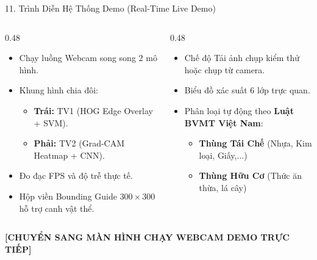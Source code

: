 \documentclass[aspectratio=169, 10pt]{beamer}
\begin{document}
\begin{frame}{11. Trình Diễn Hệ Thống Demo (Real-Time Live Demo)}
\begin{columns}[T]
  \begin{column}{0.48\textwidth}
    \begin{tcolorbox}[colback=white, colframe=UITBlue, title=\textbf{OpenCV Split-Screen Demo}]
      \begin{itemize}
        \item Chạy luồng Webcam song song 2 mô hình.
        \item Khung hình chia đôi:
        \begin{itemize}
          \item \textbf{Trái:} TV1 (HOG Edge Overlay + SVM).
          \item \textbf{Phải:} TV2 (Grad-CAM Heatmap + CNN).
        \end{itemize}
        \item Đo đạc FPS và độ trễ thực tế.
        \item Hộp viền Bounding Guide $300 \times 300$ hỗ trợ canh vật thể.
      \end{itemize}
    \end{tcolorbox}
  \end{column}

  \begin{column}{0.48\textwidth}
    \begin{tcolorbox}[colback=white, colframe=GreenRecycle, title=\textbf{Streamlit Interactive Web Dashboard}]
      \begin{itemize}
        \item Chế độ Tải ảnh chụp kiểm thử hoặc chụp từ camera.
        \item Biểu đồ xác suất 6 lớp trực quan.
        \item Phân loại tự động theo \textbf{Luật BVMT Việt Nam}:
        \begin{itemize}
          \item \textbf{Thùng Tái Chế} (Nhựa, Kim loại, Giấy,...)
          \item \textbf{Thùng Hữu Cơ} (Thức ăn thừa, lá cây)
        \end{itemize}
      \end{itemize}
    \end{tcolorbox}
  \end{column}
\end{columns}

\vspace{0.2cm}
\centering
\alert{\textbf{[CHUYỂN SANG MÀN HÌNH CHẠY WEBCAM DEMO TRỰC TIẾP]}}
\end{frame}
\end{document}
